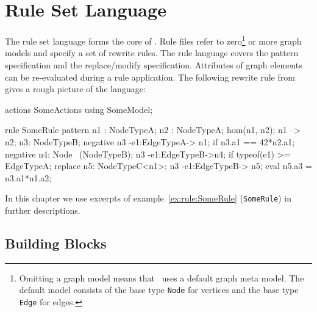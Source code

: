 \chapter{Rule Set Language}
\label{chaprulelang}

The rule set language forms the core of \GrG. Rule files refer to zero\footnote{Omitting a graph model means that \GrG\ uses a default graph meta model. The default model consists of the base type \texttt{Node} for vertices and the base type \texttt{Edge} for edges.} or more graph models and specify a set of rewrite rules. The rule language covers the pattern specification and the replace/modify specification. Attributes of graph elements can be re-evaluated during a rule application. The following rewrite rule from \cite{geiss} gives a rough picture of the language:
\begin{example}\label{ex:rule:SomeRule}
\begin{grgen}
actions SomeActions using SomeModel;

rule SomeRule {
  pattern {
    n1 : NodeTypeA;
    n2 : NodeTypeA;
    hom(n1, n2);
    n1 --> n2;
    n3: NodeTypeB;
    negative {
      n3 -e1:EdgeTypeA-> n1;
      if {n3.a1 == 42*n2.a1;}
    }
    negative {
      n4: Node \ (NodeTypeB);
      n3 -e1:EdgeTypeB->n4;
      if {typeof(e1) >= EdgeTypeA;}
    }
  }
  replace {
    n5: NodeTypeC<n1>;
    n3 -e1:EdgeTypeB-> n5;
    eval {
      n5.a3 = n3.a1*n1.a2;
    }
  }  
}
\end{grgen}
\end{example}
In this chapter we use excerpts of example~\ref{ex:rule:SomeRule} (\texttt{SomeRule}) in further descriptions.

\section{Building Blocks}
\label{rulebb}

